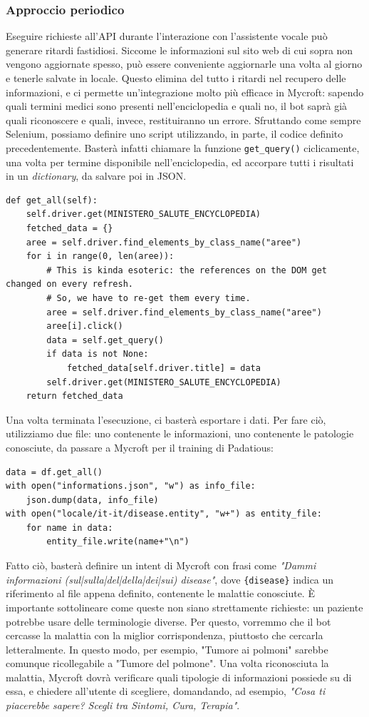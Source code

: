 \subsubsection{Approccio periodico}
Eseguire richieste all'API durante l'interazione con l'assistente vocale può generare ritardi fastidiosi. Siccome le informazioni sul sito web di cui sopra non vengono aggiornate spesso, può essere conveniente aggiornarle una volta al giorno e tenerle salvate in locale. Questo elimina del tutto i ritardi nel recupero delle informazioni, e ci permette un'integrazione molto più efficace in Mycroft: sapendo quali termini medici sono presenti nell'enciclopedia e quali no, il bot saprà già quali riconoscere e quali, invece, restituiranno un errore. Sfruttando come sempre Selenium, possiamo definire uno script utilizzando, in parte, il codice definito precedentemente. Basterà infatti chiamare la funzione \texttt{get\_query()} ciclicamente, una volta per termine disponibile nell'enciclopedia, ed accorpare tutti i risultati in un \textit{dictionary}, da salvare poi in JSON.
\begin{verbatim}
def get_all(self):
    self.driver.get(MINISTERO_SALUTE_ENCYCLOPEDIA)
    fetched_data = {}
    aree = self.driver.find_elements_by_class_name("aree")
    for i in range(0, len(aree)):
        # This is kinda esoteric: the references on the DOM get changed on every refresh. 
        # So, we have to re-get them every time.
        aree = self.driver.find_elements_by_class_name("aree")
        aree[i].click()
        data = self.get_query()
        if data is not None:
            fetched_data[self.driver.title] = data
        self.driver.get(MINISTERO_SALUTE_ENCYCLOPEDIA)
    return fetched_data
\end{verbatim}
Una volta terminata l'esecuzione, ci basterà esportare i dati. Per fare ciò, utilizziamo due file: uno contenente le informazioni, uno contenente le patologie conosciute, da passare a Mycroft per il training di Padatious:
\begin{verbatim}
data = df.get_all()
with open("informations.json", "w") as info_file:
    json.dump(data, info_file)
with open("locale/it-it/disease.entity", "w+") as entity_file:
    for name in data:
        entity_file.write(name+"\n")
\end{verbatim}
Fatto ciò, basterà definire un intent di Mycroft con frasi come \textit{"Dammi informazioni (sul|sulla|del|della|dei|sui) {disease}"}, dove \texttt{\{disease\}} indica un riferimento al file appena definito, contenente le malattie conosciute. È importante sottolineare come queste non siano strettamente richieste: un paziente potrebbe usare delle terminologie diverse. Per questo, vorremmo che il bot cercasse la malattia con la miglior corrispondenza, piuttosto che cercarla letteralmente. In questo modo, per esempio, "Tumore ai polmoni" sarebbe comunque ricollegabile a "Tumore del polmone". Una volta riconosciuta la malattia, Mycroft dovrà verificare quali tipologie di informazioni possiede su di essa, e chiedere all'utente di scegliere, domandando, ad esempio, \textit{"Cosa ti piacerebbe sapere? Scegli tra Sintomi, Cura, Terapia"}.
